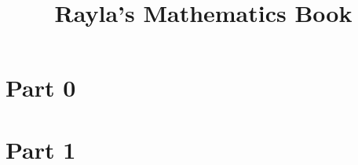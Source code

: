 \documentclass{rayla_textbook}
\title{Rayla's Mathematics Book}
\begin{document}
    \frontmatter
    \raylaStartBook
    \mainmatter

    \part{Part 0}{\lipsum[1]}
    

    \part{Part 1}{\lipsum[1]}
    
    
    
    
    
%
%    
%    
%    
%    
%    

    ~\nocite{*}

    \backmatter
    \raylaEndBook
\end{document}
